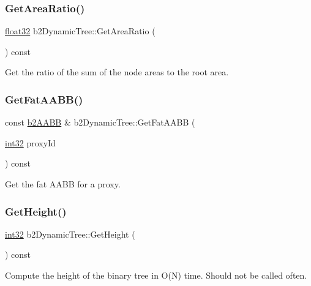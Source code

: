 \subsubsection{\texorpdfstring{GetAreaRatio()}{GetAreaRatio()}}
{\footnotesize\ttfamily \mbox{\hyperlink{b2_settings_8h_aacdc525d6f7bddb3ae95d5c311bd06a1}{float32}} b2\+Dynamic\+Tree\+::\+Get\+Area\+Ratio (\begin{DoxyParamCaption}{ }\end{DoxyParamCaption}) const}



Get the ratio of the sum of the node areas to the root area. 

\mbox{\label{classb2_dynamic_tree_a655b9ddff43e4e0a34a372eddc03ecb9}} 
\subsubsection{\texorpdfstring{GetFatAABB()}{GetFatAABB()}}
{\footnotesize\ttfamily const \mbox{\hyperlink{structb2_a_a_b_b}{b2\+A\+A\+BB}} \& b2\+Dynamic\+Tree\+::\+Get\+Fat\+A\+A\+BB (\begin{DoxyParamCaption}\item[{\mbox{\hyperlink{b2_settings_8h_a43d43196463bde49cb067f5c20ab8481}{int32}}}]{proxy\+Id }\end{DoxyParamCaption}) const\hspace{0.3cm}{\ttfamily [inline]}}



Get the fat A\+A\+BB for a proxy. 

\mbox{\label{classb2_dynamic_tree_ae3c7dc771d596f1f95fd3a3d7f2f3e97}} 
\subsubsection{\texorpdfstring{GetHeight()}{GetHeight()}}
{\footnotesize\ttfamily \mbox{\hyperlink{b2_settings_8h_a43d43196463bde49cb067f5c20ab8481}{int32}} b2\+Dynamic\+Tree\+::\+Get\+Height (\begin{DoxyParamCaption}{ }\end{DoxyParamCaption}) const}

Compute the height of the binary tree in O(\+N) time. Should not be called often. \mbox{\label{classb2_dynamic_tree_a3feab170229e0acd17f6a4ad3fca406e}} 
